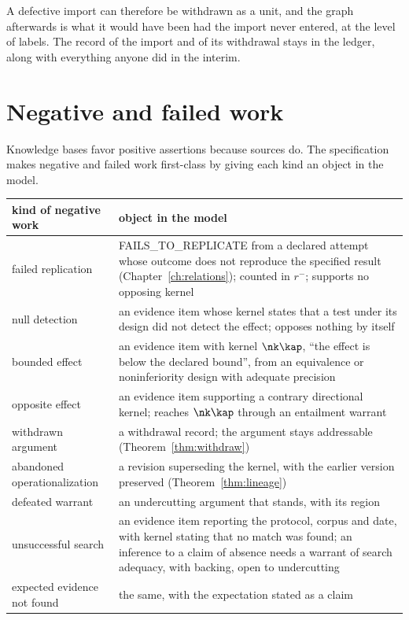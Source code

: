 A defective import can therefore be withdrawn as a unit, and the graph afterwards is what it would have been had the import never entered, at the level of labels. The record of the import and of its withdrawal stays in the ledger, along with everything anyone did in the interim.

\section{Negative and failed work}\label{sec:negative}

Knowledge bases favor positive assertions because sources do. The specification makes negative and failed work first-class by giving each kind an object in the model.

\begin{center}
\small
\begin{tabularx}{\textwidth}{@{}l X@{}}
\toprule
kind of negative work & object in the model\\
\midrule
failed replication & \textsf{FAILS\_TO\_REPLICATE} from a declared attempt whose outcome does not reproduce the specified result (Chapter~\ref{ch:relations}); counted in $r^-$; supports no opposing kernel\\
null detection & an evidence item whose kernel states that a test under its design did not detect the effect; opposes nothing by itself\\
bounded effect & an evidence item with kernel $\nk\kap$, ``the effect is below the declared bound'', from an equivalence or noninferiority design with adequate precision\\
opposite effect & an evidence item supporting a contrary directional kernel; reaches $\nk\kap$ through an entailment warrant\\
withdrawn argument & a withdrawal record; the argument stays addressable (Theorem~\ref{thm:withdraw})\\
abandoned operationalization & a revision superseding the kernel, with the earlier version preserved (Theorem~\ref{thm:lineage})\\
defeated warrant & an undercutting argument that stands, with its region\\
unsuccessful search & an evidence item reporting the protocol, corpus and date, with kernel stating that no match was found; an inference to a claim of absence needs a warrant of search adequacy, with backing, open to undercutting\\
expected evidence not found & the same, with the expectation stated as a claim\\
\bottomrule
\end{tabularx}
\end{center}

